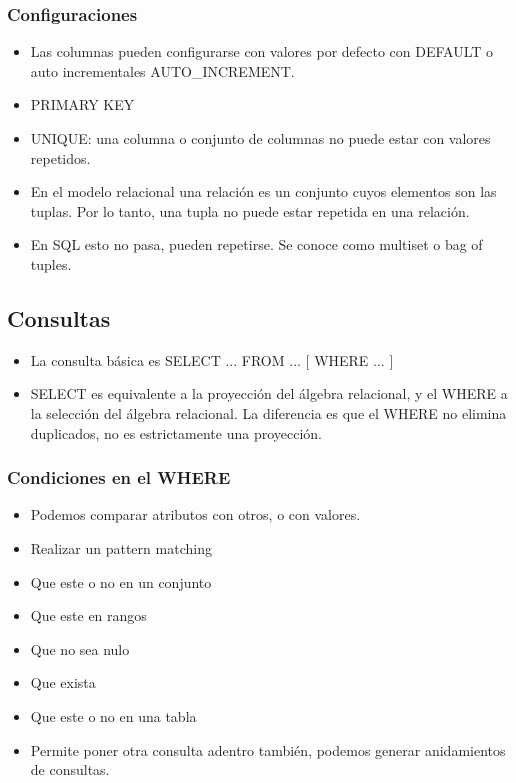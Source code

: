 \subsubsection*{Configuraciones}
\begin{itemize}
\item Las columnas pueden configurarse con valores por defecto con DEFAULT o auto incrementales AUTO\_INCREMENT.
\item PRIMARY KEY
\item UNIQUE: una columna o conjunto de columnas no puede estar con valores repetidos.
\item En el modelo relacional una relación es un conjunto cuyos elementos son las tuplas. Por lo tanto, una tupla no puede estar repetida en una relación. 
\item En SQL esto no pasa, pueden repetirse. Se conoce como multiset o bag of tuples.
\end{itemize}

\subsection*{Consultas}

\begin{itemize}
\item La consulta básica es SELECT ... FROM ... [ WHERE ... ]
\item SELECT es equivalente a la proyección del álgebra relacional, y el WHERE a la selección del álgebra relacional. La diferencia es que el WHERE no elimina duplicados, no es estrictamente una proyección.
\end{itemize}


\medskip

\subsubsection*{Condiciones en el WHERE}
\begin{itemize}
\item Podemos comparar atributos con otros, o con valores.
\item Realizar un pattern matching
\item Que este o no en un conjunto
\item Que este en rangos
\item Que no sea nulo
\item Que exista
\item Que este o no en una tabla
\item Permite poner otra consulta adentro también, podemos generar anidamientos de consultas.
\end{itemize}


